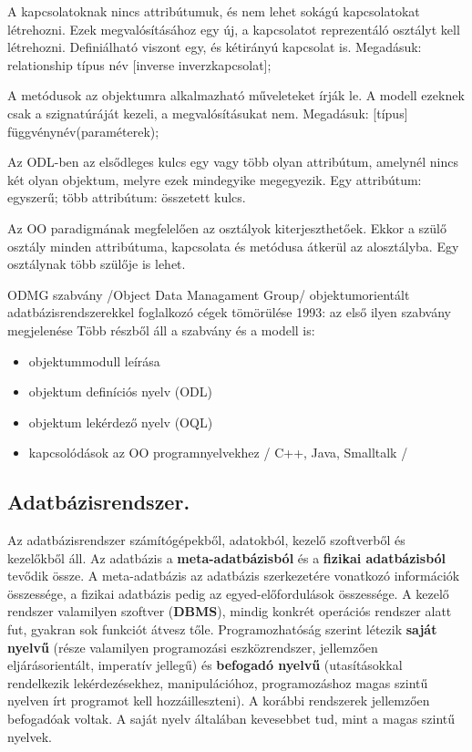 A kapcsolatoknak nincs attribútumuk, és nem lehet sokágú kapcsolatokat létrehozni. Ezek megvalósításához egy új, a kapcsolatot reprezentáló osztályt kell létrehozni. Definiálható viszont egy, és kétirányú kapcsolat is. Megadásuk: relationship típus név [inverse inverzkapcsolat];

A metódusok az objektumra alkalmazható műveleteket írják le. A modell ezeknek csak a szignatúráját kezeli, a megvalósításukat nem. Megadásuk: [típus] függvénynév(paraméterek); 

Az ODL-ben az elsődleges kulcs egy vagy több olyan attribútum, amelynél nincs két olyan objektum, melyre ezek mindegyike megegyezik. Egy attribútum: egyszerű; több attribútum: összetett kulcs.

Az OO paradigmának megfelelően az osztályok kiterjeszthetőek. Ekkor a szülő osztály minden attribútuma, kapcsolata és metódusa átkerül az alosztályba. Egy osztálynak több szülője is lehet.

ODMG szabvány /Object Data Managament Group/ objektumorientált adatbázisrendszerekkel
foglalkozó cégek tömörülése
1993: az első ilyen szabvány megjelenése
Több részből áll a szabvány és a modell is:
\begin{itemize}
	\item objektummodull leírása
	\item objektum definíciós nyelv (ODL)
	\item objektum lekérdező nyelv (OQL)
	\item kapcsolódások az OO programnyelvekhez / C++, Java, Smalltalk /
\end{itemize}


\subsection{Adatbázisrendszer.}
Az adatbázisrendszer számítógépekből, adatokból, kezelő szoftverből és kezelőkből áll. Az adatbázis a \textbf{meta-adatbázisból} és a \textbf{fizikai adatbázisból} tevődik össze. A meta-adatbázis az adatbázis szerkezetére vonatkozó információk összessége, a fizikai adatbázis pedig az egyed-előfordulások összessége. A kezelő rendszer valamilyen szoftver (\textbf{DBMS}), mindig konkrét operációs rendszer alatt fut, gyakran sok funkciót átvesz tőle. Programozhatóság szerint létezik \textbf{saját nyelvű} (része valamilyen programozási eszközrendszer, jellemzően eljárásorientált, imperatív jellegű) és \textbf{befogadó nyelvű} (utasításokkal rendelkezik lekérdezésekhez, manipulációhoz, programozáshoz magas szintű nyelven írt programot kell hozzáilleszteni). A korábbi rendszerek jellemzően befogadóak voltak. A saját nyelv általában kevesebbet tud, mint a magas szintű nyelvek.

